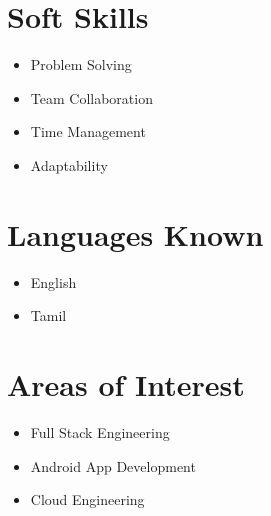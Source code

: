 \documentclass[a4paper,11pt]{article}
\begin{document}
\section{Soft Skills}
{\small
\begin{itemize}[nosep, leftmargin=1em, itemsep=1pt]
  \item Problem Solving
  \item Team Collaboration
  \item Time Management
  \item Adaptability
\end{itemize}
}

\section{Languages Known}
{\small
\begin{itemize}[nosep, leftmargin=1em, itemsep=1pt]
  \item English
  \item Tamil
\end{itemize}
}

\section{Areas of Interest}
{\small
\begin{itemize}[nosep, leftmargin=1em, itemsep=1pt]
  \item Full Stack Engineering
  \item Android App Development
  \item Cloud Engineering
\end{itemize}
}

\end{document}
